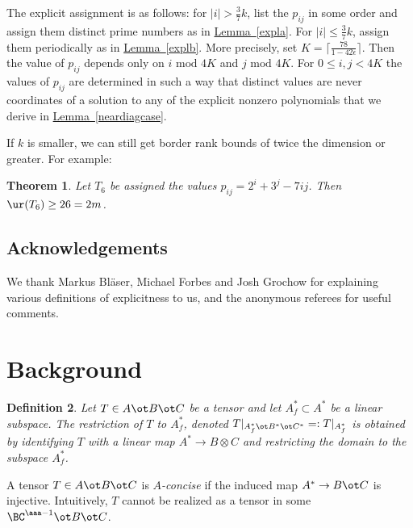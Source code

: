 \documentclass[11pt]{article}
\newcommand{\expref}[2]{\texorpdfstring{\hyperref[#2]{#1~\ref{#2}}}{#1~\ref{#2}}}
\newtheorem{theorem}{Theorem}[section]
\newtheorem{definition}[theorem]{Definition}
\begin{document}
The explicit assignment is as follows: for $|i|>\frac 37k$,  list the $p_{ij}$ in some order and assign them  
distinct  prime numbers as in \expref{Lemma}{expla}. For $|i|\leq \frac 37k$,   assign them periodically as in \expref{Lemma}{explb}. More precisely, 
set    $K=\lceil \frac{78}{1-42\epsilon}\rceil$. Then  the value of $p_{ij}$ depends only on $i \text{ mod } 4K$ and $j \text{ mod } 4K$. For $0\leq i,j<4K$
the values %
%
%
 of $p_{ij}$
are determined in such a way that 
%
%
%
 distinct values are never coordinates of 
%
a solution to any of the explicit nonzero polynomials that we derive in \expref{Lemma}{neardiagcase}. 


If $k$ is smaller, we can still get border rank bounds of twice the dimension or greater. For example:

\begin{theorem}\label{thm:explicit}
Let $T_6$ be assigned the values $p_{ij}=2^i+3^j-7ij$.
Then $\ur(T_6)\geq 26=2m$.
\end{theorem}

\subsection*{Acknowledgements}
We thank Markus Bl\"aser,  Michael Forbes and Josh Grochow for explaining various
definitions of explicitness to us, and the anonymous referees for useful comments.
%


\section{Background}
\begin{definition} Let $T\in A\ot B\ot C$ be a tensor and let $A^*_f\subset A^*$ be a linear subspace.
The \emph{restriction} of $T$ to $A_f^*$, denoted $T|_{A_f^*\ot B^*\ot C^*}=:T|_{A^*_f}$ is
obtained by identifying $T$ with a linear map $A^*\rightarrow B\otimes C$ and restricting the domain to the subspace $A_f^*$.  
\end{definition}
A tensor $T\in A\ot B\ot C$ is \emph{$A$-concise} if the induced map $A^*\rightarrow B\ot C$ is injective. Intuitively,   $T$ cannot be realized as a tensor in some  $\BC^{\aaa-1}\ot B\ot C$. 
\end{document}

